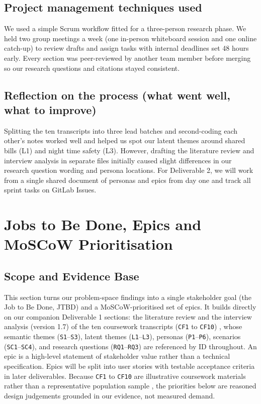 \documentclass[12pt, a4paper]{article}
\begin{document}
\subsection*{Project management techniques used}
We used a simple Scrum workflow fitted for a three-person research phase. We held two group meetings a week (one in-person whiteboard session and one online catch-up) to review drafts and assign tasks with internal deadlines set 48 hours early. Every section was peer-reviewed by another team member before merging so our research questions and citations stayed consistent.




\subsection*{Reflection on the process (what went well, what to improve)}
Splitting the ten transcripts into three lead batches and second-coding each other's notes worked well and helped us spot our latent themes around shared bills (L1) and night time safety (L3). However, drafting the literature review and interview analysis in separate files initially caused slight differences in our research question wording and persona locations. For Deliverable 2, we will work from a single shared document of personas and epics from day one and track all sprint tasks on GitLab Issues.

\clearpage
\section{Jobs to Be Done, Epics and MoSCoW Prioritisation}
\subsection{Scope and Evidence Base}
This section turns our problem-space findings into a single stakeholder goal (the Job to Be Done, JTBD) and a MoSCoW-prioritised set of epics. It builds directly on our companion Deliverable 1 sections: the literature review \cite{lee2021,gandhi2025,grinstein2018,shi2021,mulrow2019,collins2020,hoffmann2024,lasarov2024,froehlich2010,mohanty2023,brynjarsdottir2012,froehlich2012,tiefenbeck2019} and the interview analysis (version 1.7) of the ten coursework transcripts (\texttt{CF1} to \texttt{CF10}) \cite{cf1,cf2,cf3,cf4,cf5,cf6,cf7,cf8,cf9,cf10}, whose semantic themes (\texttt{S1}--\texttt{S3}), latent themes (\texttt{L1}--\texttt{L3}), personas (\texttt{P1}--\texttt{P6}), scenarios (\texttt{SC1}--\texttt{SC4}), and research questions (\texttt{RQ1}--\texttt{RQ3}) are referenced by ID throughout. An epic is a high-level statement of stakeholder value rather than a technical specification. Epics will be split into user stories with testable acceptance criteria in later deliverables. Because \texttt{CF1} to \texttt{CF10} are illustrative coursework materials rather than a representative population sample \cite{cf1,cf10}, the priorities below are reasoned design judgements grounded in our evidence, not measured demand.
\end{document}
